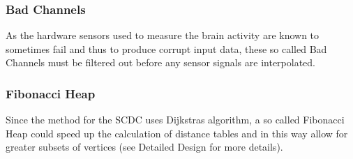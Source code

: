 \subsubsection{Bad Channels}
As the hardware sensors used to measure the brain activity are known to sometimes fail and thus to produce corrupt input data, these so called Bad Channels must be filtered out before any sensor signals are interpolated.
\subsubsection{Fibonacci Heap}
Since the method for the SCDC uses Dijkstras algorithm, a so called Fibonacci Heap could speed up the calculation of distance tables and in this way allow for greater subsets of vertices (see Detailed Design for more details).